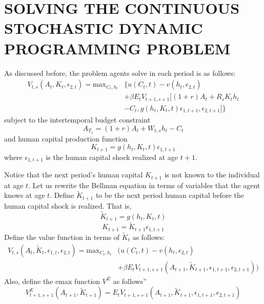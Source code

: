 \documentclass{article}
\begin{document}
\section{SOLVING THE CONTINUOUS STOCHASTIC DYNAMIC PROGRAMMING PROBLEM}
\label{section:solving}
As discussed before, the problem agents solve in each period is as follows:
\begin{equation} \tag{5'}
  \begin{split}
      V_{t,s}(A_t,K_t,\epsilon_{2,t})=\text{max}_{C_t,h_t} & \{u(C_t,t)-v(h_t, \epsilon_{2,t}) \\ & + \beta E_t V_{t+1,s+1}[(1+r)A_t + R_s K_t h_t \\ & -C_t, g(h_t,K_t,t)\epsilon_{1,t+1}, \epsilon_{2,t+1}]\}
  \end{split}
\end{equation}
subject to the intertemporal budget constraint
\begin{equation} \tag{2}
  A_{T_1}=(1+r)A_t + W_{t,s} h_t - C_t
\end{equation}
and human capital production function
\begin{equation} \tag{4}
  K_{t+1} = g(h_t, K_t, t) \epsilon_{1,t+1}
\end{equation}
where $\epsilon_{1,t+1}$ is the human capital shock realized at age $t+1$.\par
Notice that the next period's human capital $K_{t+1}$ is not known to the individual at age $t$. Let us rewrite the Bellman equation in terms of variables that the agent knows at age $t$. Define $\tilde{K}_{t+1}$ to be the next period human capital before the human capital shock is realized. That is,
\begin{equation*}
  \tilde{K}_{t+1} = g(h_t, K_t,t)
\end{equation*}
\begin{equation*}
  K_{t+1} =  \tilde{K}_{t+1} \epsilon_{1,t+1}
\end{equation*}
Define the value function in terms of $ \tilde{K}_t$ as follows:
\begin{equation*}
  \begin{split}
      V_{t,s}(A_t,\tilde{K}_t,\epsilon_{1,t},\epsilon_{2,t})=\text{max}_{C_t,h_t} & (u(C_t,t)-v(h_t, \epsilon_{2,t}) \\ & + \beta E_t V_{t+1,s+1} (A_{t+1},\tilde{K}_{t+1},\epsilon_{1,t+1},\epsilon_{2,t+1}))
  \end{split}
\end{equation*}
Also, define the emax function $V^E$ as follows''
\begin{equation*}
V^E_{t+1,s+1}(A_{t+1},\tilde{K}_{t+1}) = E_t V_{t+1,s+1}(A_{t+1},\tilde{K}_{t+1},\epsilon_{1,t+1},\epsilon_{2,t+1}) 
\end{equation*}
\end{document}
